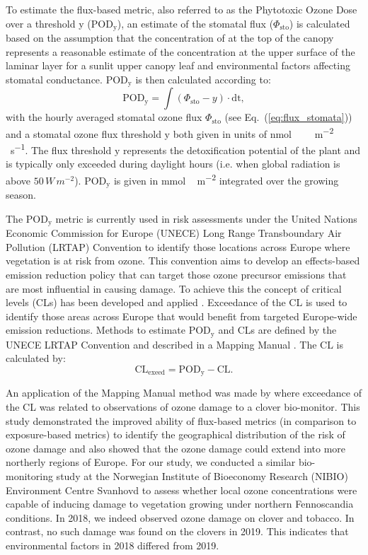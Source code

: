 \documentclass[bg, manuscript]{copernicus}
\begin{document}
To estimate the flux-based metric, also referred to as the Phytotoxic Ozone Dose over a threshold y ($\mathrm{POD_y}$), an estimate of the stomatal  flux ($\Phi_\mathrm{sto}$) is calculated based on the assumption that the concentration of  at the top of the canopy represents a reasonable estimate of the concentration at the upper surface of the laminar layer for a sunlit upper canopy leaf and environmental factors affecting stomatal conductance. $\mathrm{POD_y}$ is then calculated according to:
%
\begin{equation}
  \mathrm{POD_y} = \int{(\Phi_\mathrm{sto}-y)\cdot \mathrm{dt}},
  \label{eq:pod}
\end{equation}
%
with the hourly averaged stomatal ozone flux $\Phi_\mathrm{sto}$ (see Eq.~(\ref{eq:flux_stomata})) and a stomatal ozone flux threshold $\mathrm{y}$ both given in units of \unit{nmol\,\,m^{-2}\,\,s^{-1}}. The flux threshold $\mathrm{y}$ represents the detoxification potential of the plant and is typically only exceeded during daylight hours (i.e. when global radiation is above $50\,\unit{W\,m^{-2}}$). $\mathrm{POD_y}$ is given in \unit{mmol\,m^{-2}} integrated over the growing season.

The $\mathrm{POD_y}$ metric is currently used in risk assessments under the United Nations Economic Commission for Europe (UNECE) Long Range Transboundary Air Pollution (LRTAP) Convention to identify those locations across Europe where vegetation is at risk from ozone. This convention aims to develop an effects-based emission reduction policy that can target those ozone precursor emissions that are most influential in causing damage. To achieve this the concept of critical levels (CLs) has been developed and applied \citep{Maas2016}. Exceedance of the CL is used to identify those areas across Europe that would benefit from targeted Europe-wide emission reductions. Methods to estimate $\mathrm{POD_y}$ and CLs are defined by the UNECE LRTAP Convention and described in a Mapping Manual \citep{ICP:MappingManual2017}. The CL is calculated by: 
%
\begin{equation}
  \mathrm{CL_{exeed}} = \mathrm{POD_y} - \mathrm{CL}.
\end{equation}
%

An application of the Mapping Manual method was made by \citet{GCB:Mills2011} where exceedance of the CL was related to observations of ozone damage to a clover bio-monitor. This study demonstrated the improved ability of flux-based metrics (in comparison to exposure-based metrics) to identify the geographical distribution of the risk of ozone damage and also showed that the ozone damage could extend into more northerly regions of Europe. For our study, we conducted a similar bio-monitoring study at the Norwegian Institute of Bioeconomy Research (NIBIO) Environment Centre Svanhovd to assess whether local ozone concentrations were capable of inducing damage to vegetation growing under northern Fennoscandia conditions. In 2018, we indeed observed ozone damage on clover and tobacco. In contrast, no such damage was found on the clovers in 2019. This indicates that environmental factors in 2018 differed from 2019.
\end{document}
